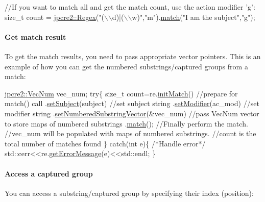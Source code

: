 \begin{DoxyCode}
\textcolor{comment}{//If you want to match all and get the match count, use the action modifier 'g':}
\textcolor{keywordtype}{size\_t} count = \hyperlink{classjpcre2_1_1Regex}{jpcre2::Regex}(\textcolor{stringliteral}{"(\(\backslash\)\(\backslash\)d)|(\(\backslash\)\(\backslash\)w)"},\textcolor{stringliteral}{"m"}).\hyperlink{classjpcre2_1_1Regex_ab93775a93a0a537d09b9e9ab4a5a3894}{match}(\textcolor{stringliteral}{"I am the subject"},\textcolor{stringliteral}{"g"});
\end{DoxyCode}
\hypertarget{index_do-match}{}\paragraph{Get match result}\label{index_do-match}
To get the match results, you need to pass appropriate vector pointers. This is an example of how you can get the numbered substrings/captured groups from a match\+:


\begin{DoxyCode}
\hyperlink{namespacejpcre2_ac1cf752c8fbb0be78020be3b80e77ce3}{jpcre2::VecNum} vec\_num;
\textcolor{keywordflow}{try}\{
    \textcolor{keywordtype}{size\_t} count=re.\hyperlink{classjpcre2_1_1Regex_a519b0915bf1163c6ce6a4d674b30cfcd}{initMatch}()                                 \textcolor{comment}{//prepare for match() call}
                   .\hyperlink{classjpcre2_1_1RegexMatch_a635c652195deaa8ebb9e107c4f972aab}{setSubject}(subject)                         \textcolor{comment}{//set subject string}
                   .\hyperlink{classjpcre2_1_1RegexMatch_a9df7e92f96b61553f62720cb8f5f23e5}{setModifier}(ac\_mod)                         \textcolor{comment}{//set modifier string}
                   .\hyperlink{classjpcre2_1_1RegexMatch_a2c7efe1ec2e13827f670db4ecedcd0a0}{setNumberedSubstringVector}(&vec\_num)        \textcolor{comment}{//pass VecNum
       vector to store maps of numbered substrings}
                   .\hyperlink{classjpcre2_1_1RegexMatch_a5868aef3a146594ea1ebef34d122bb33}{match}();                                    \textcolor{comment}{//Finally perform the match.}
    \textcolor{comment}{//vec\_num will be populated with maps of numbered substrings.}
    \textcolor{comment}{//count is the total number of matches found}
\}
\textcolor{keywordflow}{catch}(\textcolor{keywordtype}{int} e)\{
    \textcolor{comment}{/*Handle error*/}
    std::cerr<<re.\hyperlink{classjpcre2_1_1Regex_a83b93ff7f6860757445e5edbecbfb7a2}{getErrorMessage}(e)<<std::endl;
\}
\end{DoxyCode}
 \hypertarget{index_access-a-capture-group}{}\paragraph{Access a captured group}\label{index_access-a-capture-group}
You can access a substring/captured group by specifying their index (position)\+:



